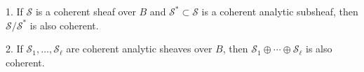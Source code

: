 1. If $\mathcal{S}$ is a coherent sheaf over $B$ and $\mathcal{S}^* \subset \mathcal{S}$ is a coherent analytic subsheaf, then $\mathcal{S}/\mathcal{S}^*$ is also coherent.

2. If $\mathcal{S}_1, \ldots, \mathcal{S}_\ell$ are coherent analytic sheaves over $B$, then $\mathcal{S}_1 \oplus \cdots \oplus \mathcal{S}_\ell$ is also coherent.
